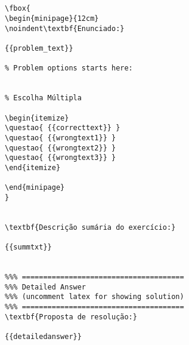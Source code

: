 








\vspace{0.3cm}

\begin{verbatim}


\fbox{
\begin{minipage}{12cm}
\noindent\textbf{Enunciado:}

{{problem_text}}

% Problem options starts here:


% Escolha Múltipla

\begin{itemize}
\questao{ {{correcttext}} }
\questao{ {{wrongtext1}} }
\questao{ {{wrongtext2}} }
\questao{ {{wrongtext3}} }
\end{itemize}

\end{minipage} 
}


\textbf{Descrição sumária do exercício:}

{{summtxt}}


%%% ======================================
%%% Detailed Answer 
%%% (uncomment latex for showing solution)
%%% ======================================
\textbf{Proposta de resolução:}

{{detailedanswer}}

\end{verbatim}




